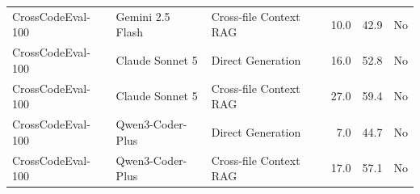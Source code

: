 \begin{table}[t]
\begin{tabular}{lllrrl}
CrossCodeEval-100 & Gemini 2.5 Flash & Cross-file Context RAG & 10.0 & 42.9 & No \\
CrossCodeEval-100 & Claude Sonnet 5 & Direct Generation & 16.0 & 52.8 & No \\
CrossCodeEval-100 & Claude Sonnet 5 & Cross-file Context RAG & 27.0 & 59.4 & No \\
CrossCodeEval-100 & Qwen3-Coder-Plus & Direct Generation & 7.0 & 44.7 & No \\
CrossCodeEval-100 & Qwen3-Coder-Plus & Cross-file Context RAG & 17.0 & 57.1 & No \\
\bottomrule
\end{tabular}
\end{table}
